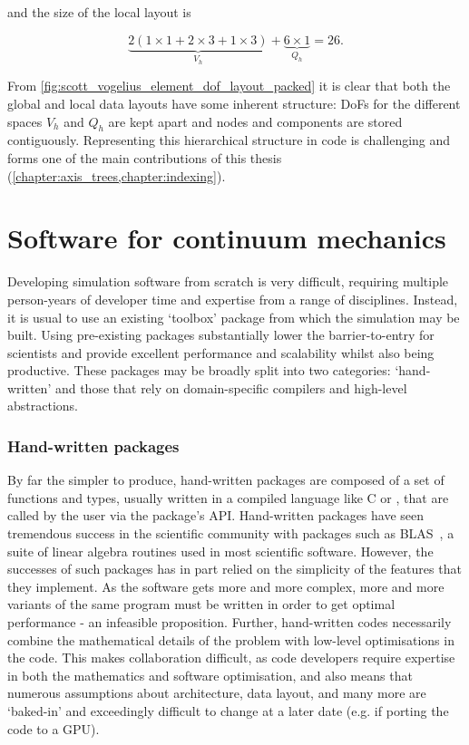 \documentclass[thesis]{subfiles}
\begin{document}
\noindent
and the size of the local layout is

\begin{equation*}
  \underbrace{2 ( 1 \times 1 + 2 \times 3 + 1 \times 3 )}_{V_h} + \underbrace{6 \times 1}_{Q_h} = 26.
\end{equation*}

From \cref{fig:scott_vogelius_element_dof_layout_packed} it is clear that both the global and local data layouts have some inherent structure: DoFs for the different spaces $V_h$ and $Q_h$ are kept apart and nodes and components are stored contiguously.
Representing this hierarchical structure in code is challenging and forms one of the main contributions of this thesis (\cref{chapter:axis_trees,chapter:indexing}).

\section{Software for continuum mechanics}


Developing simulation software from scratch is very difficult, requiring multiple person-years of developer time and expertise from a range of disciplines.
Instead, it is usual to use an existing `toolbox' package from which the simulation may be built.
Using pre-existing packages substantially lower the barrier-to-entry for scientists and provide excellent performance and scalability whilst also being productive.
These packages may be broadly split into two categories: `hand-written' and those that rely on domain-specific compilers and high-level abstractions.

\subsubsection{Hand-written packages}

By far the simpler to produce, hand-written packages are composed of a set of functions and types, usually written in a compiled language like C or \cplusplus, that are called by the user via the package's API.
Hand-written packages have seen tremendous success in the scientific community with packages such as BLAS~\cite{lawsonBasicLinearAlgebra1979}, a suite of linear algebra routines used in most scientific software.
However, the successes of such packages has in part relied on the simplicity of the features that they implement.
As the software gets more and more complex, more and more variants of the same program must be written in order to get optimal performance - an infeasible proposition.
Further, hand-written codes necessarily combine the mathematical details of the problem with low-level optimisations in the code.
This makes collaboration difficult, as code developers require expertise in both the mathematics and software optimisation, and also means that numerous assumptions about architecture, data layout, and many more are `baked-in' and exceedingly difficult to change at a later date (e.g. if porting the code to a GPU).
\end{document}
